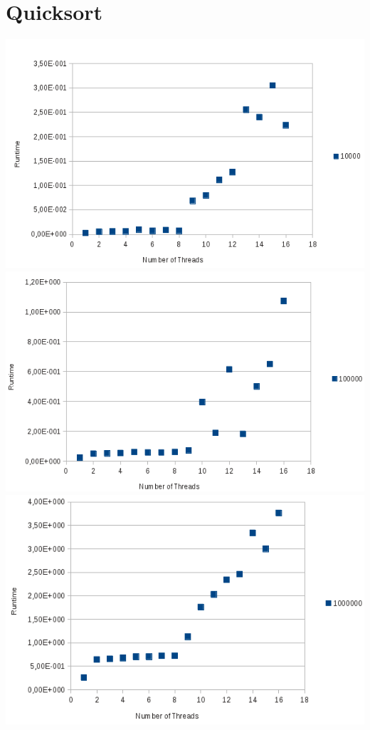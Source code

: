 \documentclass[a4paper,10pt]{article}
\begin{document}
\section{Quicksort}
\begin{center}
\includegraphics{strong_scaling_10000.png}\\
\includegraphics{strong_scaling_100000.png}\\
\includegraphics{strong_scaling_1000000.png}\\

\end{center}
\end{document}
